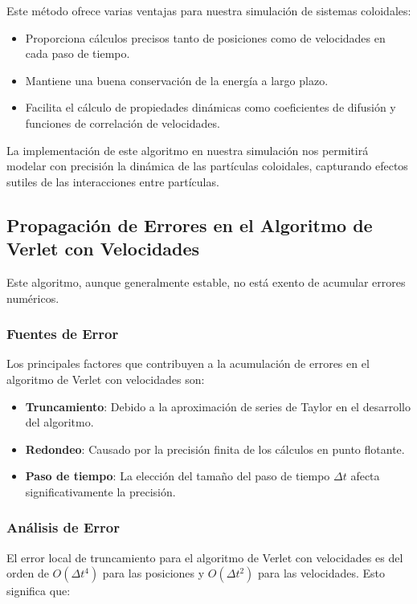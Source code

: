 \documentclass[twocolumn]{article}
\begin{document}
Este método ofrece varias ventajas para nuestra simulación de sistemas coloidales:
\begin{itemize}
    \item Proporciona cálculos precisos tanto de posiciones como de velocidades en cada paso de tiempo.
    \item Mantiene una buena conservación de la energía a largo plazo.
    \item Facilita el cálculo de propiedades dinámicas como coeficientes de difusión y funciones de correlación de velocidades.
\end{itemize}

La implementación de este algoritmo en nuestra simulación nos permitirá modelar con precisión la dinámica de las partículas coloidales, capturando efectos sutiles de las interacciones entre partículas.
\subsection*{Propagación de Errores en el Algoritmo de Verlet con Velocidades}
Este algoritmo, aunque generalmente estable, no está exento de acumular errores numéricos.

\subsubsection*{Fuentes de Error}
Los principales factores que contribuyen a la acumulación de errores en el algoritmo de Verlet con velocidades son:

\begin{itemize}
    \item \textbf{Truncamiento}: Debido a la aproximación de series de Taylor en el desarrollo del algoritmo.
    \item \textbf{Redondeo}: Causado por la precisión finita de los cálculos en punto flotante.
    \item \textbf{Paso de tiempo}: La elección del tamaño del paso de tiempo $\Delta t$ afecta significativamente la precisión.
\end{itemize}

\subsubsection*{Análisis de Error}
El error local de truncamiento para el algoritmo de Verlet con velocidades es del orden de $O(\Delta t^4)$ para las posiciones y $O(\Delta t^2)$ para las velocidades. Esto significa que:
\end{document}
